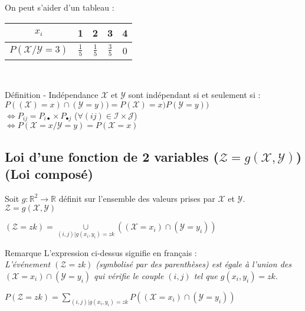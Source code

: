 \documentclass[a4paper, 12pt]{article}
\begin{document}
On peut s'aider d'un tableau :

{\Large
\begin{center}
\begin{tabular}{c|cccc}
	$x_i$ & 1 & 2  & 3 & 4 \\
	\hline
	$P (\mathcal{X} / \mathcal{Y} = 3)$ & $\frac{1}{5}$ & $\frac{1}{5}$ & $\frac{3}{5}$ & 0
\end{tabular}\\
\end{center}
}

\begin{definition}{Définition - Indépendance}
$\mathcal{X}$ et $\mathcal{Y}$ sont indépendant si et seulement si :\\
$P ((\mathcal{X}) = x) \cap (\mathcal{Y} = y)) = P (\mathcal{X}) = x) P(\mathcal{Y} = y))$\\
$\Leftrightarrow P_{ij} = P_{i \bullet} \times P_{\bullet j}$ ($\forall (ij) \in \mathcal{I} \times \mathcal{J}$)\\
$\Leftrightarrow P (\mathcal{X} = x / \mathcal{Y} = y) = P (\mathcal{X} = x)$
\end{definition}



\subsection{Loi d'une fonction de 2 variables ($\mathcal{Z} = g(\mathcal{X}, \mathcal{Y})$) (Loi composé)}
Soit $g: \mathbb{R}^2 \longrightarrow \mathbb{R}$ définit sur l'ensemble des valeurs prises par $\mathcal{X}$ et $\mathcal{Y}$.\\
$\mathcal{Z} = g(\mathcal{X}, \mathcal{Y})$\\
\begin{center}
$(\mathcal{Z} = zk) = \underset{(i, j) | g (x_i, y_i) = zk}{\cup} ((\mathcal{X} = x_i) \cap (\mathcal{Y} = y_i))$
\end{center}

\begin{remarque}{Remarque}
L'expression ci-dessus signifie en français :\\
\emph{L'événement $(\mathcal{Z} = zk)$ (symbolisé par des parenthèses) est égale à l'union des $(\mathcal{X} = x_i) \cap (\mathcal{Y} = y_i)$ qui vérifie le couple $(i, j)$ tel que $g (x_i, y_i) = zk$}.
\end{remarque}

\begin{center}
$\boxed{P (\mathcal{Z} = zk) = \underset{(i, j) | g (x_i, y_i) = zk}{\sum} P ((\mathcal{X} = x_i) \cap (\mathcal{Y} = y_i))}$
\end{center}
\end{document}

